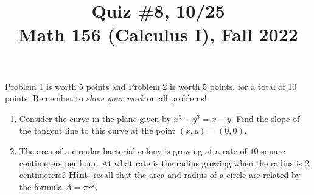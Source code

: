 \documentclass[11pt]{article}
\title{Quiz \#8, 10/25 \\ Math 156 (Calculus I), Fall 2022}
\date{}
\begin{document}
\maketitle

\thispagestyle{empty}

\vspace{-1cm}

Problem 1 is worth 5 points and Problem 2 is worth 5 points, for a total of 10 points. Remember to \emph{show your work} on all problems!

\begin{enumerate}
\item Consider the curve in the plane given by $x^3 + y^3 = x - y$. Find the slope of the tangent line to this curve at the point $(x,y)=(0,0)$.

\vspace{6.5cm}

\item The area of a circular bacterial colony is growing at a rate of $10$ square centimeters per hour. At what rate is the radius growing when the radius is $2$ centimeters? {\bf Hint}: recall that the area and radius of a circle are related by the formula $A=\pi r^2$.
\end{enumerate}
\end{document}
